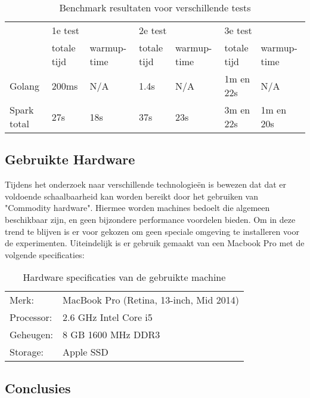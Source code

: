 \begin{table}[h]
\centering
\caption{Benchmark resultaten voor verschillende tests}
\label{tab:benchmarks}
\begin{tabular}{|l|l|l|l|l|l|l|}
\hline
\multirow{2}{*}{} & \multicolumn{2}{l|}{1e test} & \multicolumn{2}{l|}{2e test} & \multicolumn{2}{l|}{3e test} \\ \cline{2-7} 
                  & totale tijd   & warmup-time  & totale tijd   & warmup-time  & totale tijd   & warmup-time  \\ \hline
Golang            & 200ms         & N/A          & 1.4s          & N/A          & 1m en 22s     & N/A          \\ \hline
Spark total       & 27s           & 18s          & 37s           & 23s          & 3m en 22s     & 1m en 20s    \\ \hline
\end{tabular}
\end{table}

\clearpage

\subsection{Gebruikte Hardware}
\label{subsec:hardware_specs}

Tijdens het onderzoek naar verschillende technologieën is bewezen dat dat er voldoende schaalbaarheid kan worden bereikt door het gebruiken van "Commodity hardware". Hiermee worden machines bedoelt die algemeen beschikbaar zijn, en geen bijzondere performance voordelen bieden. Om in deze trend te blijven is er voor gekozen om geen speciale omgeving te installeren voor de experimenten. Uiteindelijk is er gebruik gemaakt van een Macbook Pro met de volgende specificaties:

\begin{table}[h]
\caption{Hardware specificaties van de gebruikte machine}
\label{tab:hardware_specs}
\begin{tabular}{ll}
Merk:      & MacBook Pro (Retina, 13-inch, Mid 2014) \\
Processor: & 2.6 GHz Intel Core i5                   \\
Geheugen:  & 8 GB 1600 MHz DDR3                      \\
Storage:   & Apple SSD                                  
\end{tabular}
\end{table}

\subsection{Conclusies}

